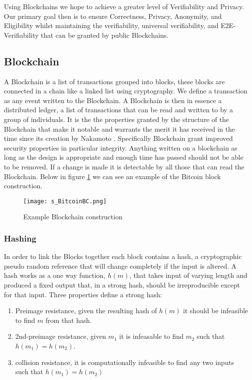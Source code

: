\documentclass{entcs}
\begin{document}
Using Blockchains we hope to achieve a greater level of Verifiability and Privacy. Our primary goal then is to ensure Correctness, Privacy, Anonymity, and Eligibility whilst maintaining the verifiability, universal verifiability, and E2E-Verifiability that can be granted by public Blockchains.



\subsection{Blockchain}
A Blockchain is a list of transactions grouped into blocks, these blocks are connected in a chain like a linked list \cite{blockchainBeginners} using cryptography. We define a transaction as any event written to the Blockchain. A Blockchain is then in essence a distributed ledger, a list of transactions that can be read and written to by a group of individuals. It is the the properties granted by the structure of the Blockchain that make it notable and warrants the merit it has received in the time since its creation by Nakamoto \cite{BTCWhitepaper}. Specifically Blockchain grant improved security properties in particular integrity. Anything written on a blockchain as long as the design is appropriate and enough time has passed should not be able to be removed. If a change is made it is detectable by all those that can read the Blockchain. Below in figure \ref{fig:BlockCon} we can see an example of the Bitcoin block construction.

%
\begin{figure}[h!]
    \centering
    \texttt{[image: s\_BitcoinBC.png]}
    \caption{Example Blockchain construction}
    \label{fig:BlockCon}
\end{figure}

\subsubsection{Hashing}
In order to link the Blocks together each block contains a hash, a cryptographic pseudo random reference that will change completely if the input is altered. A hash works as a one way function, \(h(m)\), that takes input of varying length and produced a fixed output that, in a strong hash, should be irreproducible except for that input. Three properties \cite{cryptoHandbook} define a strong hash:

\begin{enumerate}
    \item Preimage resistance, given the resulting hash of \(h(m)\) it should be infeasible to find \(m\) from that hash. 
    \item 2nd-preimage resistance, given \(m_1\) it is infeasable to find \(m_2\) such that \(h(m_1) = h(m_2)\).
    \item collision resistance, it is computationally infeasible to find any two inputs such that \(h(m_1) = h(m_2)\)
\end{enumerate}
\end{document}
